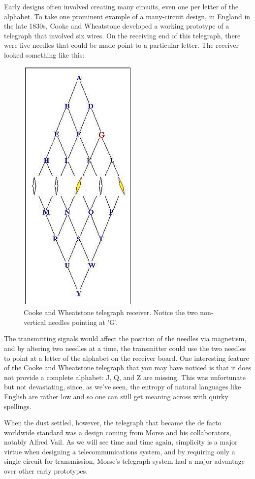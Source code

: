 \documentclass[UTF8]{book}
\begin{document}
\begin{CJK}{UTF8}{gbsn}
Early designs often involved creating many circuits, even one per letter of the alphabet. To take one prominent example of a many-circuit design, in England in the late 1830s, Cooke and Wheatstone developed a working prototype of a telegraph that involved six wires. On the receiving end of this telegraph, there were five needles that could be made point to a particular letter. The receiver looked something like this:

\begin{figure}[H]
\centering
\includegraphics[width=0.4\linewidth]{wheatstone}
\caption{Cooke and Wheatstone telegraph receiver. Notice the two non-vertical needles pointing at 'G'.}
\end{figure}

The transmitting signals would affect the position of the needles via magnetism, and by altering two needles at a time, the transmitter could use the two needles to point at a letter of the alphabet on the receiver board. One interesting feature of the Cooke and Wheatstone telegraph that you may have noticed is that it does not provide a complete alphabet: J, Q, and Z are missing. This was unfortunate but not devastating, since, as we've seen, the entropy of natural languages like English are rather low and so one can still get meaning across with quirky spellings.

When the dust settled, however, the telegraph that became the de facto worldwide standard was a design coming from Morse and his collaborators, notably Alfred Vail. As we will see time and time again, simplicity is a major virtue when designing a telecommunications system, and by requiring only a single circuit for transmission, Morse's telegraph system had a major advantage over other early prototypes.


\end{CJK}
\end{document}
